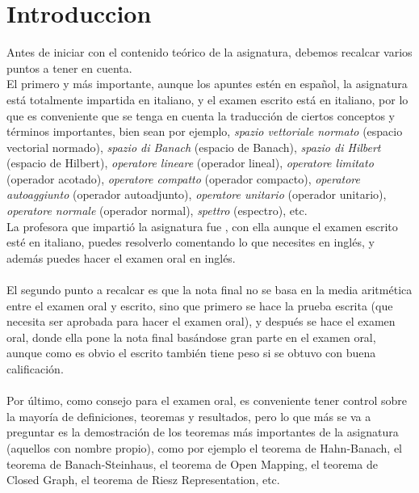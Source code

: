 \chapter{Introduccion}
\noindent
Antes de iniciar con el contenido teórico de la asignatura, debemos recalcar varios puntos a tener en cuenta. \\

\noindent
El primero y más importante, aunque los apuntes estén en español, la asignatura está totalmente impartida en italiano, y el examen escrito está en italiano, por lo que es conveniente que se tenga en cuenta la traducción de ciertos conceptos y términos importantes, bien sean por ejemplo, \textit{spazio vettoriale normato} (espacio vectorial normado), \textit{spazio di Banach} (espacio de Banach), \textit{spazio di Hilbert} (espacio de Hilbert), \textit{operatore lineare} (operador lineal), \textit{operatore limitato} (operador acotado), \textit{operatore compatto} (operador compacto), \textit{operatore autoaggiunto} (operador autoadjunto), \textit{operatore unitario} (operador unitario), \textit{operatore normale} (operador normal), \textit{spettro} (espectro), etc. \\

\noindent
La profesora que impartió la asignatura fue , con ella aunque el examen escrito esté en italiano, puedes resolverlo comentando lo que necesites en inglés, y además puedes hacer el examen oral en inglés. \\ \\

\noindent
El segundo punto a recalcar es que la nota final no se basa en la media aritmética entre el examen oral y escrito, sino que primero se hace la prueba escrita (que necesita ser aprobada para hacer el examen oral), y después se hace el examen oral, donde ella pone la nota final basándose gran parte en el examen oral, aunque como es obvio el escrito también tiene peso si se obtuvo con buena calificación. \\ \\

\noindent
Por último, como consejo para el examen oral, es conveniente tener control sobre la mayoría de definiciones, teoremas y resultados, pero lo que más se va a preguntar es la demostración de los teoremas más importantes de la asignatura (aquellos con nombre propio), como por ejemplo el teorema de Hahn-Banach, el teorema de Banach-Steinhaus, el teorema de Open Mapping, el teorema de Closed Graph, el teorema de Riesz Representation, etc. \\ \\